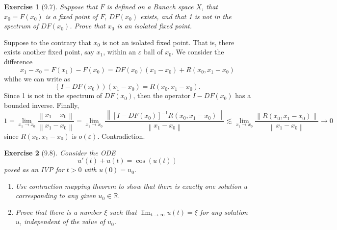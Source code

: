 \documentclass[letterpaper,twoside,11pt]{article}
\theoremstyle{mystyle}
\newtheorem*{exercise}{Exercise}
\newcommand{\R}{{\mathbb R}}
\newcommand{\cbk}{\color{black}}
\newcommand{\cblu}{\color{blue}}
\newcommand{\ve}{\varepsilon}
\begin{document}
\cbk 

\begin{exercise}[9.7]
  Suppose that $F$ is defined on a Banach space $X$, that $x_0 = F(x_0)$ is a fixed point of $F$, $DF(x_0)$ exists, and that 1 is not in the spectrum of $DF(x_0)$. Prove that $x_0$ is an isolated fixed point. 
\end{exercise}

\cblu 
  Suppose to the contrary that $x_0$ is not an isolated fixed point. That is, there exists another fixed point, say $x_1$, within an $\ve$ ball of $x_0$. We consider the difference 
  \[{x_1} - {x_0} = F\left( {{x_1}} \right) - F\left( {{x_0}} \right) = DF\left( {{x_0}} \right)\left( {{x_1} - {x_0}} \right) + R\left( {{x_0},{x_1} - {x_0}} \right)\]
  whihc we can write as 
  \[\left( {I - DF\left( {{x_0}} \right)} \right)\left( {{x_1} - {x_0}} \right) = R\left( {{x_0},{x_1} - {x_0}} \right).\]
  Since 1 is not in the spectrum of $DF(x_0)$, then the operator $I - DF(x_0)$ has a bounded inverse. Finally, 
  \[1 = \mathop {\lim }\limits_{{x_1} \to {x_0}} \frac{{\left\| {{x_1} - {x_0}} \right\|}}{{\left\| {{x_1} - {x_0}} \right\|}} = \mathop {\lim }\limits_{{x_1} \to {x_0}} \frac{{\left\| {{{\left[ {I - DF\left( {{x_0}} \right)} \right]}^{ - 1}}R\left( {{x_0},{x_1} - {x_0}} \right)} \right\|}}{{\left\| {{x_1} - {x_0}} \right\|}} \lesssim \mathop {\lim }\limits_{{x_1} \to {x_0}} \frac{{\left\| {R\left( {{x_0},{x_1} - {x_0}} \right)} \right\|}}{{\left\| {{x_1} - {x_0}} \right\|}} \to 0\]
  since $R(x_0, x_1-x_0)$ is $o\left( \ve \right)$. Contradiction. 

\cbk 

\begin{exercise}[9.8]
  Consider the ODE 
  \[u'(t) + u(t) = \cos(u(t))\]
  posed as an IVP for $t > 0$ with $u(0) = u_0$. 
  \begin{enumerate}
    \item Use contraction mapping theorem to show that there is exactly one solution $u$ corresponding to any given $u_0 \in \R$. 
    \item Prove that there is a number $\xi$ such that $\lim_{t\to \infty} u(t) = \xi$ for any solution $u$, independent of the value of $u_0$. 
  \end{enumerate}
\end{exercise}
\end{document}
